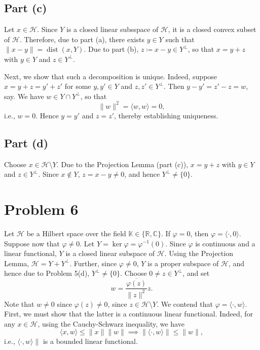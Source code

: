 \documentclass[11pt]{article}
\theoremstyle{thmstyle}
\theoremstyle{defstyle}
\newcommand{\R}{\mathbb{R}}
\newcommand{\bbC}{\mathbb{C}}
\newcommand{\K}{\mathbb{K}} %
\renewcommand{\le}{\leqslant}
\newcommand{\dist}{\operatorname{dist}}
\newcommand{\calH}{\mathcal{H}}
\begin{document}
\subsection{Part (c)}

Let $x\in\calH$. Since $Y$ is a closed linear subsspace of $\calH$, it is a closed convex subset of $\calH$. Therefore, due to part (a), there exists $y\in Y$ such that $\|x - y\| = \dist(x, Y)$. Due to part (b), $z \coloneq x - y\in Y^\perp$, so that $x = y + z$ with $y\in Y$ and $z\in Y^\perp$.

Next, we show that such a decomposition is unique. Indeed, suppose $x = y + z = y' + z'$ for some $y, y'\in Y$ and $z, z'\in Y^\perp$. Then $y - y' = z' - z = w$, say. We have $w\in Y\cap Y^\perp$, so that 
\begin{equation*}
    \|w\|^2 = \langle w, w\rangle = 0,
\end{equation*}
i.e., $w = 0$. Hence $y = y'$ and $z = z'$, thereby establishing uniqueness.

\subsection{Part (d)}

Choose $x\in\calH\setminus Y$. Due to the Projection Lemma (part (c)), $x = y + z$ with $y\in Y$ and $z\in Y^\perp$. Since $x\notin Y$, $z = x - y\ne 0$, and hence $Y^\perp\ne\{0\}$.

\section{Problem 6}

Let $\calH$ be a Hilbert space over the field $\K\in\{\R,\bbC\}$.
If $\varphi = 0$, then $\varphi = \langle \cdot, 0\rangle$. Suppose now that $\varphi\ne 0$.
Let $Y = \ker\varphi = \varphi^{-1}(0)$. Since $\varphi$ is continuous and a linear functional, $Y$ is a closed linear subspace of $\calH$. Using the Projection Lemma, $\calH = Y + Y^\perp$. Further, since $\varphi\ne0$, $Y$ is a proper subspace of $\calH$, and hence due to Problem 5(d), $Y^\perp\ne\{0\}$. Choose $0\ne z\in Y^\perp$, and set 
\begin{equation*}
    w = \frac{\overline{\varphi(z)}}{\|z\|^2}z.
\end{equation*}
Note that $w\ne 0$ since $\varphi(z)\ne 0$, since $z\in\calH\setminus Y$. We contend that $\varphi = \langle\cdot, w\rangle$. First, we must show that the latter is a continuous linear functional. Indeed, for any $x\in\calH$, using the Cauchy-Schwarz inequality, we have 
\begin{equation*}
    \langle x, w\rangle\le\|x\|\|w\|\implies\|\langle\cdot, w\rangle\|\le \|w\|,
\end{equation*}
i.e., $\langle\cdot ,w\rangle\|$ is a bounded linear functional. 
\end{document}
